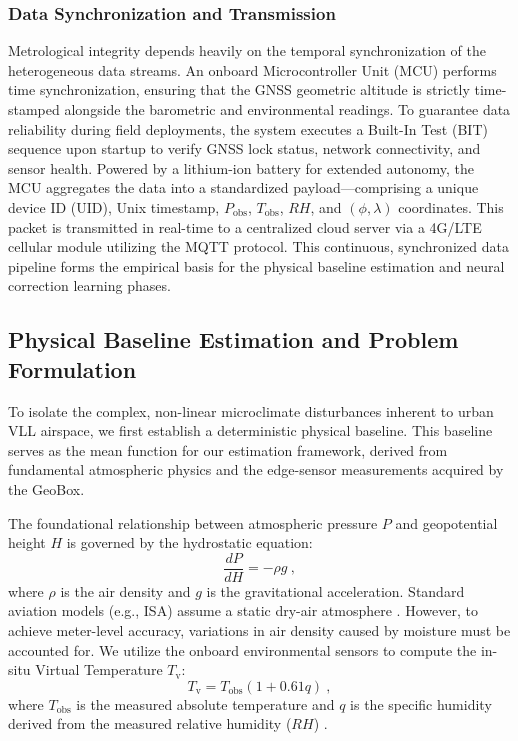 \subsubsection{Data Synchronization and Transmission}
Metrological integrity depends heavily on the temporal synchronization of the heterogeneous data streams. An onboard Microcontroller Unit (MCU) performs time synchronization, ensuring that the GNSS geometric altitude is strictly time-stamped alongside the barometric and environmental readings. To guarantee data reliability during field deployments, the system executes a Built-In Test (BIT) sequence upon startup to verify GNSS lock status, network connectivity, and sensor health. Powered by a lithium-ion battery for extended autonomy, the MCU aggregates the data into a standardized payload---comprising a unique device ID (UID), Unix timestamp, $P_\text{obs}$, $T_\text{obs}$, $RH$, and $(\phi, \lambda)$ coordinates. This packet is transmitted in real-time to a centralized cloud server via a 4G/LTE cellular module utilizing the MQTT protocol. This continuous, synchronized data pipeline forms the empirical basis for the physical baseline estimation and neural correction learning phases.

\subsection{Physical Baseline Estimation and Problem Formulation}
\label{subsec:physical_baseline}

To isolate the complex, non-linear microclimate disturbances inherent to urban VLL airspace, we first establish a deterministic physical baseline. This baseline serves as the mean function for our estimation framework, derived from fundamental atmospheric physics and the edge-sensor measurements acquired by the GeoBox.

The foundational relationship between atmospheric pressure $P$ and geopotential height $H$ is governed by the hydrostatic equation:
\begin{equation}
\frac{dP}{dH} = -\rho g \ ,
\label{eq:hydrostatic}
\end{equation}
where $\rho$ is the air density and $g$ is the gravitational acceleration. Standard aviation models (e.g., ISA) assume a static dry-air atmosphere \cite{icao1993manual}. However, to achieve meter-level accuracy, variations in air density caused by moisture must be accounted for. We utilize the onboard environmental sensors to compute the in-situ Virtual Temperature $T_\text{v}$:
\begin{equation}
T_\text{v} = T_\text{obs} (1 + 0.61 q) \ ,
\label{eq:virtual_temp}
\end{equation}
where $T_\text{obs}$ is the measured absolute temperature and $q$ is the specific humidity derived from the measured relative humidity ($RH$) \cite{simonetti2024geodetic}. 

